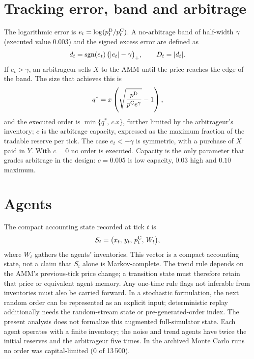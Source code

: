 \section{Tracking error, band and arbitrage}

The logarithmic error is $e_t=\log(p^{\mathrm{D}}_t/p^{\mathrm{C}}_t)$. A no-arbitrage band of half-width $\gamma$ (executed value $0.003$) and the signed excess error are defined as
\begin{equation}
  d_t = \operatorname{sgn}(e_t)\,\bigl(|e_t|-\gamma\bigr)_+ ,\qquad D_t=|d_t|.
  \label{eq:exceso}
\end{equation}
If $e_t>\gamma$, an arbitrageur sells $X$ to the AMM until the price reaches the edge of the band. The size that achieves this is
\begin{equation}
  q^{\ast} = x\left(\sqrt{\frac{p^{\mathrm{D}}}{p^{\mathrm{C}} e^{\gamma}}}-1\right),
  \label{eq:qstar}
\end{equation}
and the executed order is $\min\{q^{\ast},\,c\,x\}$, further limited by the arbitrageur's inventory; $c$ is the arbitrage capacity, expressed as the maximum fraction of the tradable reserve per tick. The case $e_t<-\gamma$ is symmetric, with a purchase of $X$ paid in $Y$. With $c=0$ no order is executed. Capacity is the only parameter that grades arbitrage in the design: $c=0.005$ is low capacity, $0.03$ high and $0.10$ maximum.

\section{Agents}

The compact accounting state recorded at tick $t$ is
\begin{equation}
  S_t = \bigl(x_t,\,y_t,\,p^{\mathrm{C}}_t,\,W_t\bigr),
  \label{eq:estado}
\end{equation}
where $W_t$ gathers the agents' inventories. This vector is a compact accounting state, not a claim that $S_t$ alone is Markov-complete. The trend rule depends on the AMM's previous-tick price change; a transition state must therefore retain that price or equivalent agent memory. Any one-time rule flags not inferable from inventories must also be carried forward. In a stochastic formulation, the next random order can be represented as an explicit input; deterministic replay additionally needs the random-stream state or pre-generated-order index. The present analysis does not formalize this augmented full-simulator state. Each agent operates with a finite inventory; the noise and trend agents have twice the initial reserves and the arbitrageur five times. In the archived Monte Carlo runs no order was capital-limited (0 of 13\,500).

